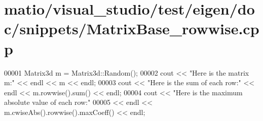 \hypertarget{matio_2visual__studio_2test_2eigen_2doc_2snippets_2_matrix_base__rowwise_8cpp_source}{}\section{matio/visual\+\_\+studio/test/eigen/doc/snippets/\+Matrix\+Base\+\_\+rowwise.cpp}
\label{matio_2visual__studio_2test_2eigen_2doc_2snippets_2_matrix_base__rowwise_8cpp_source}

\begin{DoxyCode}
00001 Matrix3d m = Matrix3d::Random();
00002 cout << \textcolor{stringliteral}{"Here is the matrix m:"} << endl << m << endl;
00003 cout << \textcolor{stringliteral}{"Here is the sum of each row:"} << endl << m.rowwise().sum() << endl;
00004 cout << \textcolor{stringliteral}{"Here is the maximum absolute value of each row:"}
00005      << endl << m.cwiseAbs().rowwise().maxCoeff() << endl;
\end{DoxyCode}
